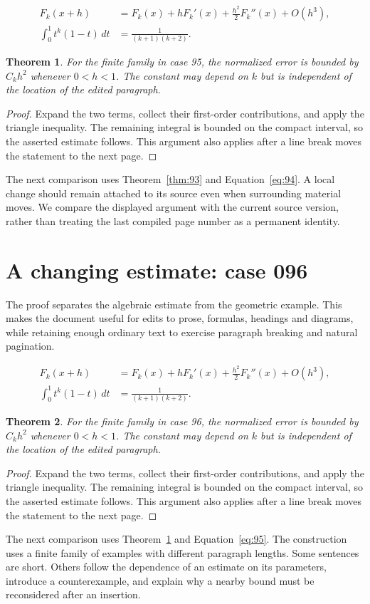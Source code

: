 \documentclass[a4paper,10pt]{article}
\newtheorem{theorem}{Theorem}[section]
\begin{document}
\lipsum[13-14]
\begin{align}\label{eq:94}
 F_k(x+h)&=F_k(x)+hF_k'(x)+\frac{h^2}{2}F_k''(x)+O(h^3),\\
 \int_0^1 t^k(1-t)\,dt&=\frac{1}{(k+1)(k+2)}.
\end{align}
\begin{theorem}\label{thm:94}
For the finite family in case 95, the normalized error is bounded by $C_k h^2$ whenever $0<h<1$. The constant may depend on $k$ but is independent of the location of the edited paragraph.
\end{theorem}
\begin{proof}
Expand the two terms, collect their first-order contributions, and apply the
triangle inequality. The remaining integral is bounded on the compact interval,
so the asserted estimate follows. This argument also applies after a line break
moves the statement to the next page.
\end{proof}
The next comparison uses Theorem~\ref{thm:93} and Equation~\ref{eq:94}. A local change should remain attached to its source even when surrounding material moves. We compare the displayed argument with the current source version, rather than treating the last compiled page number as a permanent identity.

\lipsum[23]

\section{A changing estimate: case 096}\label{unit:95}
The proof separates the algebraic estimate from the geometric example. This makes the document useful for edits to prose, formulas, headings and diagrams, while retaining enough ordinary text to exercise paragraph breaking and natural pagination.

\lipsum[16-17]
\begin{align}\label{eq:95}
 F_k(x+h)&=F_k(x)+hF_k'(x)+\frac{h^2}{2}F_k''(x)+O(h^3),\\
 \int_0^1 t^k(1-t)\,dt&=\frac{1}{(k+1)(k+2)}.
\end{align}
\begin{theorem}\label{thm:95}
For the finite family in case 96, the normalized error is bounded by $C_k h^2$ whenever $0<h<1$. The constant may depend on $k$ but is independent of the location of the edited paragraph.
\end{theorem}
\begin{proof}
Expand the two terms, collect their first-order contributions, and apply the
triangle inequality. The remaining integral is bounded on the compact interval,
so the asserted estimate follows. This argument also applies after a line break
moves the statement to the next page.
\end{proof}
The next comparison uses Theorem~\ref{thm:94} and Equation~\ref{eq:95}. The construction uses a finite family of examples with different paragraph lengths. Some sentences are short. Others follow the dependence of an estimate on its parameters, introduce a counterexample, and explain why a nearby bound must be reconsidered after an insertion.
\end{document}
